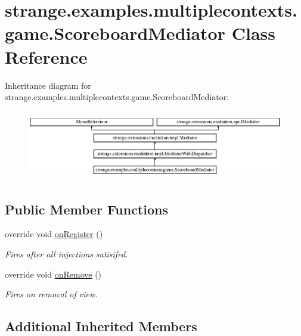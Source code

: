 \hypertarget{classstrange_1_1examples_1_1multiplecontexts_1_1game_1_1_scoreboard_mediator}{\section{strange.\-examples.\-multiplecontexts.\-game.\-Scoreboard\-Mediator Class Reference}
\label{classstrange_1_1examples_1_1multiplecontexts_1_1game_1_1_scoreboard_mediator}
}
Inheritance diagram for strange.\-examples.\-multiplecontexts.\-game.\-Scoreboard\-Mediator\-:\begin{figure}[H]
\begin{center}
\leavevmode
\includegraphics[height=3.068493cm]{classstrange_1_1examples_1_1multiplecontexts_1_1game_1_1_scoreboard_mediator}
\end{center}
\end{figure}
\subsection*{Public Member Functions}
\begin{DoxyCompactItemize}
\item 
override void \hyperlink{classstrange_1_1examples_1_1multiplecontexts_1_1game_1_1_scoreboard_mediator_aa9340f063ec746bfb0a407fcc41c3ace}{on\-Register} ()
\begin{DoxyCompactList}\small\item\em Fires after all injections satisifed. \end{DoxyCompactList}\item 
override void \hyperlink{classstrange_1_1examples_1_1multiplecontexts_1_1game_1_1_scoreboard_mediator_ae7e845945c66f320b7a34f50f7102a8d}{on\-Remove} ()
\begin{DoxyCompactList}\small\item\em Fires on removal of view. \end{DoxyCompactList}\end{DoxyCompactItemize}
\subsection*{Additional Inherited Members}



